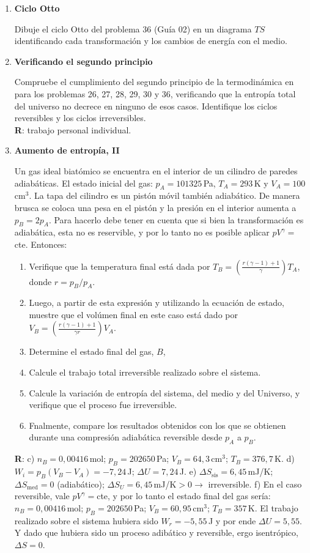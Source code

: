 \documentclass[a4paper,12pt]{article}
\begin{document}
\begin{enumerate}
	\item {\bf{Ciclo Otto}}

		Dibuje el ciclo Otto del problema 36 (Guía 02) en un diagrama $TS$
		identificando cada transformación y los cambios de energía con el
		medio.

	\item {\bf{Verificando el segundo principio}}

		Compruebe el cumplimiento del segundo principio de la termodinámica en
		para los problemas 26, 27, 28, 29, 30 y 36, verificando que la entropía total
		del universo no decrece en ninguno de esos casos. Identifique los
		ciclos reversibles y los ciclos irreversibles.
        \\{\bf{R}}: trabajo personal individual.
		
	\item {\bf{Aumento de entropía, II}}
		
		Un gas ideal biatómico se encuentra en el interior de un cilindro de
		paredes adiabáticas. El estado inicial del gas: $p_A=101325$\,Pa,
		$T_A=293$\,K y $V_A=100$\,cm$^3$. La tapa del cilindro es un pistón
		móvil también adiabático. De manera brusca se coloca una pesa en el
		pistón y la presión en el interior aumenta a $p_B=2 p_A$. Para hacerlo
		debe tener en cuenta que si bien la transformación es adiabática, esta
		no es reservible, y por lo tanto no es posible aplicar
		$pV^{\gamma}=$cte. Entonces:
		\begin{enumerate}
			\item Verifique que la temperatura final está dada por $T_B=\left (
				\frac{r (\gamma-1) + 1}{\gamma}\right ) T_A$, donde $r=p_B/p_A$.
			\item Luego, a partir de esta expresión y utilizando la ecuación de
				estado, muestre que el volúmen final en este caso está dado por
				$V_B=\left ( \frac{r (\gamma-1) + 1}{\gamma r}\right ) V_A$.
			\item Determine el estado final del gas, $B$, 
			\item Calcule el trabajo total irreversible realizado sobre el
				sistema. 
			\item Calcule la variación de entropía del sistema, del medio y del
				Universo, y verifique que el proceso fue irreversible.
			\item Fnalmente, compare los resultados obtenidos con los que se
				obtienen durante una compresión adiabática reversible desde
				$p_A$ a $p_B$.
		\end{enumerate}
		{\bf{R}}: 
		c) $n_B=0,00416$\,mol; $p_B=202650$\,Pa; $V_B=64,3$\,cm$^3$; $T_B=376,7$\,K. 
		d) $W_i = p_B (V_B - V_A) = -7,24$\,J; $\Delta U = 7,24$\,J.
		e) $\Delta S_{\mathrm{sis}}=6,45$\,mJ/K; $\Delta S_{\mathrm{med}}=0$
		(adiabático); $\Delta S_U=6,45$\,mJ/K$>0\to$ irreversible.
		f) En el caso reversible, vale $pV^\gamma=$cte, y por lo tanto el
		estado final del gas sería: $n_B=0,00416$\,mol; $p_B=202650$\,Pa;
		$V_B=60,95$\,cm$^3$; $T_B=357$\,K. El trabajo realizado sobre el
		sistema hubiera sido $W_r=-5,55$\,J y por ende $\Delta U=5,55$. Y dado
		que hubiera sido un proceso adibático y reversible, ergo isentrópico,
		$\Delta S=0$.
\end{enumerate}
\end{document}
